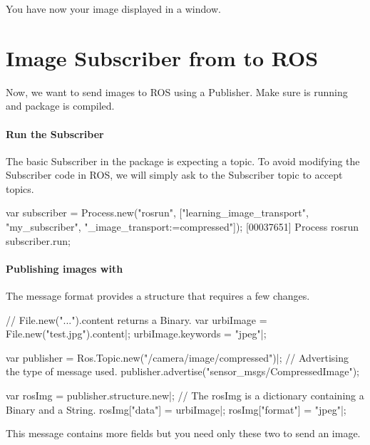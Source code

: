 You have now your image displayed in a window.

\section{Image Subscriber from \urbi to ROS}

Now, we want to send images to ROS using a \urbi Publisher.
Make sure  is running and
 package is compiled.

\paragraph{Run the Subscriber}

The basic Subscriber in the  package
is expecting a  topic. To avoid modifying the
Subscriber code in ROS, we will simply ask to the Subscriber topic
to accept  topics.

\begin{urbiunchecked}
var subscriber =
  Process.new("rosrun",
              ["learning_image_transport", "my_subscriber",
              "_image_transport:=compressed"]);
[00037651] Process rosrun
subscriber.run;
\end{urbiunchecked}

\paragraph{Publishing images with \urbi}

The  message format provides a
structure that requires a few changes.

\begin{urbiunchecked}
// File.new("...").content returns a Binary.
var urbiImage = File.new("test.jpg").content|;
urbiImage.keywords = "jpeg"|;

var publisher = Ros.Topic.new("/camera/image/compressed")|;
// Advertising the type of message used.
publisher.advertise("sensor_msgs/CompressedImage");

var rosImg = publisher.structure.new|;
// The rosImg is a dictionary containing a Binary and a String.
rosImg["data"] = urbiImage|;
rosImg["format"] = "jpeg"|;
\end{urbiunchecked}

This message contains more fields but you need only these two to
send an image.

